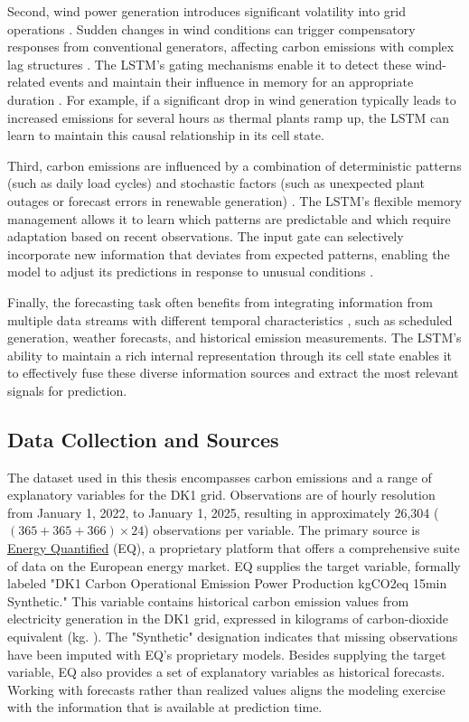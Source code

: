 Second, wind power generation introduces significant volatility into grid operations \parencite{wang2017, iea2023}. Sudden changes in wind conditions can trigger compensatory responses from conventional generators, affecting carbon emissions with complex lag structures \parencite{carlini2023,dong2019}. The LSTM's gating mechanisms enable it to detect these wind-related events and maintain their influence in memory for an appropriate duration \parencite{goodfellow2016}. For example, if a significant drop in wind generation typically leads to increased emissions for several hours as thermal plants ramp up, the LSTM can learn to maintain this causal relationship in its cell state.

Third, carbon emissions are influenced by a combination of deterministic patterns (such as daily load cycles) and stochastic factors (such as unexpected plant outages or forecast errors in renewable generation) \parencite{leerbeck2020}. The LSTM's flexible memory management allows it to learn which patterns are predictable and which require adaptation based on recent observations. The input gate can selectively incorporate new information that deviates from expected patterns, enabling the model to adjust its predictions in response to unusual conditions \parencite{goodfellow2016}.

Finally, the forecasting task often benefits from integrating information from multiple data streams with different temporal characteristics \parencite{leerbeck2020,kohut2025}, such as scheduled generation, weather forecasts, and historical emission measurements. The LSTM's ability to maintain a rich internal representation through its cell state enables it to effectively fuse these diverse information sources and extract the most relevant signals for prediction.

\subsection{Data Collection and Sources}

The dataset used in this thesis encompasses carbon emissions and a range of explanatory variables for the DK1 grid. Observations are of hourly resolution from January 1, 2022, to January 1, 2025, resulting in approximately 26,304 (\((365+365+366)\times24\)) observations per variable. The primary source is \href{https://www.energyquantified.com/}{Energy Quantified} (EQ), a proprietary platform that offers a comprehensive suite of data on the European energy market. EQ supplies the target variable, formally labeled "DK1 Carbon Operational Emission Power Production kgCO2eq 15min Synthetic." This variable contains historical carbon emission values from electricity generation in the DK1 grid, expressed in kilograms of carbon-dioxide equivalent (kg. \cotwoe{}). The "Synthetic" designation indicates that missing observations have been imputed with EQ's proprietary models. Besides supplying the target variable, EQ also provides a set of explanatory variables as historical forecasts. Working with forecasts rather than realized values aligns the modeling exercise with the information that is available at prediction time.

